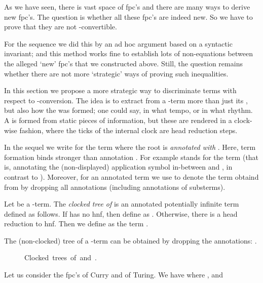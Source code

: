 
As we have seen, there is vast space of fpc's
and there are many ways to derive new fpc's.
The question is whether all these fpc's are indeed new.
So we have to prove that they are not -convertible.

For the \bohm{} sequence we did this by an ad hoc argument
based on a syntactic invariant; 
and this method works fine to establish lots of non-equations
between the alleged `new' fpc's that we constructed above.
Still, the question remains whether there are 
not more `strategic' ways of proving such inequalities. 

In this section we propose a more strategic way 
to discriminate terms with respect to -conversion.
The idea is to extract from a -term more than just its ,
but also how the  was formed; 
one could say, in what tempo, or in what rhythm.
A  is formed from static pieces of information,
but these are rendered in a clock-wise fashion,
where the ticks of the internal clock are head reduction steps.

In the sequel we write  for
the term  where the root is \emph{annotated with }.
Here, term formation binds stronger than annotation .
For example  stands for the term 
(that is, annotating the (non-displayed) application symbol in-between  and ,
in contrast to ).
Moreover, for an annotated term  we use 
to denote the term obtaind from  by dropping all annotations (including annotations of substerms).

\begin{definition}\label{def:cbohm}
  Let  be a -term.
  The \emph{clocked \bohm{} tree  of }
  is an annotated potentially infinite term defined as follows.
  If  has no hnf, then define  as .
Otherwise,
  there is a head reduction  to hnf.
  Then we define 
   as the term .
\end{definition}
\noindent
The (non-clocked) \boehm{} tree of a -term 
can be obtained by dropping the annotations:
.



\begin{figure}[ht!]
  \begin{center}
  \caption{\mbox{Clocked \bohm{} trees of  and .}}
  \vspace{-4ex}
  \label{fig:boem:y0:y1}
  \end{center}
\end{figure}
Let us consider the fpc's  of Curry and  of Turing.
We have  
where , and

